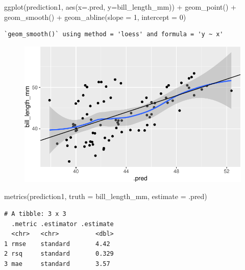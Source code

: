 \documentclass[
  letterpaper,
  DIV=11,
  numbers=noendperiod]{scrreprt}
\newenvironment{Shaded}{\begin{snugshade}}{\end{snugshade}}
\newcommand{\AttributeTok}[1]{\textcolor[rgb]{0.40,0.45,0.13}{#1}}
\newcommand{\DecValTok}[1]{\textcolor[rgb]{0.68,0.00,0.00}{#1}}
\newcommand{\FunctionTok}[1]{\textcolor[rgb]{0.28,0.35,0.67}{#1}}
\newcommand{\NormalTok}[1]{\textcolor[rgb]{0.00,0.23,0.31}{#1}}
\newcommand{\SpecialCharTok}[1]{\textcolor[rgb]{0.37,0.37,0.37}{#1}}
\begin{document}
\begin{Shaded}
\begin{Highlighting}[]
\FunctionTok{ggplot}\NormalTok{(prediction1, }\FunctionTok{aes}\NormalTok{(}\AttributeTok{x=}\NormalTok{.pred, }\AttributeTok{y=}\NormalTok{bill\_length\_mm)) }\SpecialCharTok{+} \FunctionTok{geom\_point}\NormalTok{() }\SpecialCharTok{+} \FunctionTok{geom\_smooth}\NormalTok{() }\SpecialCharTok{+} \FunctionTok{geom\_abline}\NormalTok{(}\AttributeTok{slope =} \DecValTok{1}\NormalTok{, }\AttributeTok{intercept =} \DecValTok{0}\NormalTok{)}
\end{Highlighting}
\end{Shaded}

\begin{verbatim}
`geom_smooth()` using method = 'loess' and formula = 'y ~ x'
\end{verbatim}

\begin{figure}[H]

{\centering \includegraphics{./10-model_selection_files/figure-pdf/unnamed-chunk-31-1.pdf}

}

\end{figure}

\begin{Shaded}
\begin{Highlighting}[]
\FunctionTok{metrics}\NormalTok{(prediction1, }\AttributeTok{truth =}\NormalTok{ bill\_length\_mm, }\AttributeTok{estimate =}\NormalTok{ .pred)}
\end{Highlighting}
\end{Shaded}

\begin{verbatim}
# A tibble: 3 x 3
  .metric .estimator .estimate
  <chr>   <chr>          <dbl>
1 rmse    standard       4.42 
2 rsq     standard       0.329
3 mae     standard       3.57 
\end{verbatim}
\end{document}
